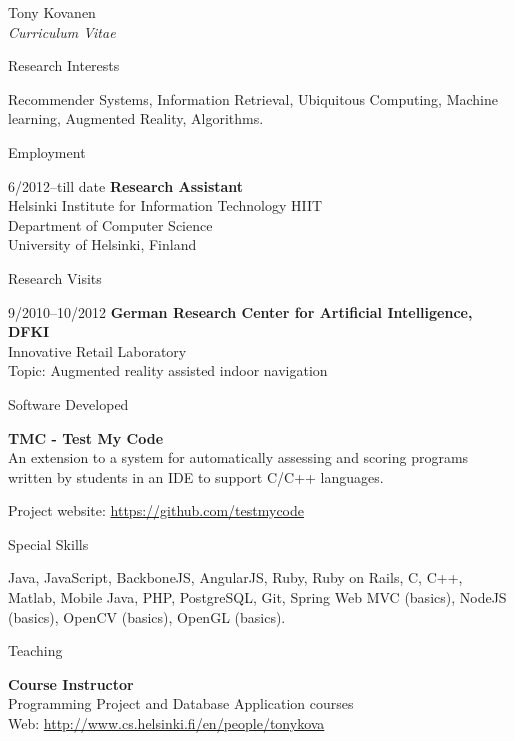 \documentclass[10pt]{article}
\begin{document}
\begin{cv}{Tony Kovanen\\{\large \itshape Curriculum Vitae}}
\begin{cvlist}{Research Interests}
	\item Recommender Systems, Information Retrieval, Ubiquitous Computing, Machine learning, Augmented Reality, Algorithms.
\end{cvlist}

\newpage
\begin{cvlist}{Employment}
	\item[6/2012--till date] {\bf Research Assistant}\\
	Helsinki Institute for Information Technology HIIT\\
	Department of Computer Science\\
	University of Helsinki, Finland

\end{cvlist}

\begin{cvlist}{Research Visits}
	\item[9/2010--10/2012] {\bf German Research Center for Artificial Intelligence, DFKI}\\		
		Innovative Retail Laboratory\\	
		Topic: Augmented reality assisted indoor navigation
\end{cvlist}

\begin{cvlist}{Software Developed}
	\item \textbf{TMC - Test My Code}\\
    An extension to a system for automatically assessing and scoring programs written by students in an IDE to support C/C++ languages. 
	\item Project website: \url{https://github.com/testmycode}	
\end{cvlist}

\begin{cvlist}{Special Skills}
\item Java, JavaScript, BackboneJS, AngularJS, Ruby, Ruby on Rails, C, C++, Matlab, Mobile Java, PHP, PostgreSQL, Git, Spring Web MVC (basics), NodeJS (basics), OpenCV (basics), OpenGL (basics). 
\end{cvlist}

\begin{cvlist}{Teaching}
	\item {\bf Course Instructor}\\
	Programming Project and Database Application courses\\
	Web: \url{http://www.cs.helsinki.fi/en/people/tonykova}
		

\end{cvlist}
\end{cv}
\end{document}
